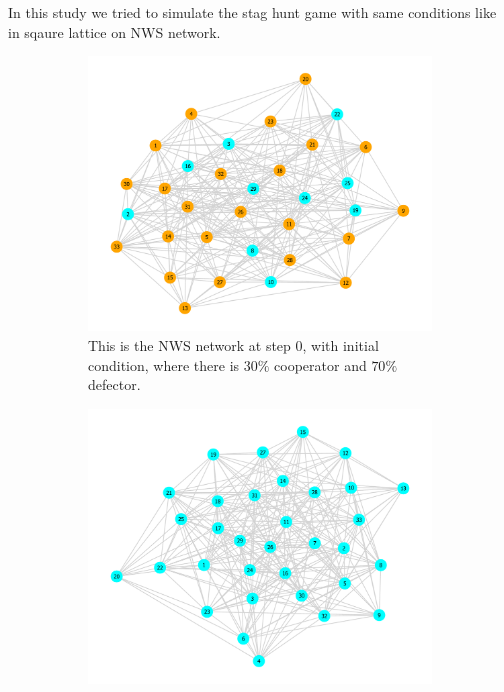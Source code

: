 \documentclass{article}
\begin{document}
In this study we tried to simulate the stag hunt game with same conditions like in sqaure lattice on NWS network.
\begin{figure}[ht]
  \centering
  \begin{subfigure}[b]{0.45\textwidth}
    \centering
    \includegraphics[width=\textwidth]{SH_WS_step_0.pdf}
    \caption{This is the NWS network at step $0$, with initial condition, where there is $30\%$ cooperator and $70\%$ defector.}
    \label{fig:fig8}
  \end{subfigure}
  \hfill
  \begin{subfigure}[b]{0.45\textwidth}
    \centering
    \includegraphics[width=\textwidth]{SH_WS_final_step.pdf}

\end{subfigure}
\end{figure}
\end{document}
